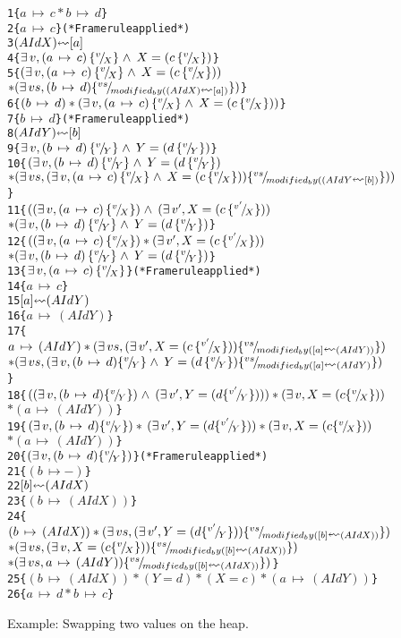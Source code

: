 \begin{figure}
\begin{alltt}
1  \{\( a\,\mapsto\,c * b\,\mapsto\,d \)\}
2     \{\( a\,\mapsto\,c \)\}                    (* Frame rule applied *)
3        \((AId X) \lsquigarr [ a ]\)
4     \{\( \exists\,v,(a\,\mapsto\,c)\,\subst{v}{X}\land\,X=(c\,\subst{v}{X}) \)\}
5  \{\( (\exists\,v,(a\,\mapsto\,c)\,\subst{v}{X}\land\,X=(c\,\subst{v}{X})) \)
      \(* (\exists\,vs,(b\,\mapsto\,d)\subst{vs}{modified_by((AId X)\lsquigarr[a])}) \)\}
6  \{\( (b\,\mapsto\,d)*(\exists\,v,(a\,\mapsto\,c)\,\subst{v}{X}\land\,X=(c\,\subst{v}{X})) \)\}
7     \{\( b\,\mapsto\,d \)\}                    (* Frame rule applied *)
8        \((AId Y) \lsquigarr [ b ]\)
9     \{\( \exists\,v,(b\,\mapsto\,d)\,\subst{v}{Y}\land\,Y=(d\,\subst{v}{Y}) \)\}
10 \{\( (\exists\,v,(b\,\mapsto\,d)\,\subst{v}{Y}\land\,Y=(d\,\subst{v}{Y}) \)
      \(* (\exists\,vs,(\exists\,v,(a\,\mapsto\,c)\,\subst{v}{X}\land\,X=(c\,\subst{v}{X}))\subst{vs}{modified_by((AId Y\lsquigarr[b])})) \)\}
11 \{\( ((\exists\,v,(a\,\mapsto\,c)\,\subst{v}{X})\land\,(\exists\,v',X=(c\,\subst{v'}{X}))\)
      \(* (\exists\,v,(b\,\mapsto\,d)\,\subst{v}{Y}\land\,Y=(d\,\subst{v}{Y}) \)\}
12 \{\( ((\exists\,v,(a\,\mapsto\,c)\,\subst{v}{X})*(\exists\,v',X=(c\,\subst{v'}{X}))\)
      \(* (\exists\,v,(b\,\mapsto\,d)\,\subst{v}{Y}\land\,Y=(d\,\subst{v}{Y}) \)\}
13    \{\( \exists\,v,(a\,\mapsto\,c)\,\subst{v}{X} \)\}           (* Frame rule applied *)
14     \{\( a\,\mapsto\,c \)\}
15       \([ a ] \lsquigarr (AId Y)\)
16     \{\( a\,\mapsto\,(AId Y) \)\}
17 \{\( a\,\mapsto\,(AId Y)*(\exists\,vs,(\exists\,v',X=(c\,\subst{v'}{X}))\subst{vs}{modified_by([a]\lsquigarr(AId Y))}) \)
      \(* (\exists\,vs,(\exists\,v,(b\,\mapsto\,d)\subst{v}{Y}\land\,Y=(d\,\subst{v}{Y})\subst{vs}{modified_by([a]\lsquigarr(AId Y)}) \)\}
18 \{\( ((\exists\,v,(b\,\mapsto\,d)\subst{v}{Y})\land\,(\exists\,v',Y=(d\subst{v'}{Y})))*(\exists\,v,X=(c\subst{v}{X})) \)
      \(* (a\,\mapsto\,(AId Y)) \)\}
19 \{\( (\exists\,v,(b\,\mapsto\,d)\subst{v}{Y})*\,(\exists\,v',Y=(d\subst{v'}{Y}))*(\exists\,v,X=(c\subst{v}{X})) \)
      \(* (a\,\mapsto\,(AId Y)) \)\}
20    \{\( (\exists\,v,(b\,\mapsto\,d)\subst{v}{Y}) \)\}           (* Frame rule applied *)
21    \{\( (b\,\mapsto-) \)\}
22       \([ b ] \lsquigarr (AId X)\)
23    \{\( (b\,\mapsto\,(AId X)) \)\}
24 \{\( (b\,\mapsto\,(AId X))*(\exists\,vs,(\exists\,v',Y=(d\subst{v'}{Y}))\subst{vs}{modified_by([b]\lsquigarr(AId X))}) \)
      \(* (\exists\,vs,(\exists\,v,X=(c\subst{v}{X}))\subst{vs}{modified_by([b]\lsquigarr(AId X))}) \)
      \(* (\exists\,vs,a\,\mapsto\,(AId Y))\subst{vs}{modified_by([b]\lsquigarr(AId X))}) \)\}
25 \{\( (b\,\mapsto\,(AId X))*(Y=d)*(X=c)*(a\,\mapsto\,(AId Y)) \)\}
26 \{\({ a\,\mapsto\,d * b\,\mapsto\,c }\)\}
\end{alltt}
\caption{Example: Swapping two values on the heap.}
\label{fig:dec_example}
\end{figure}